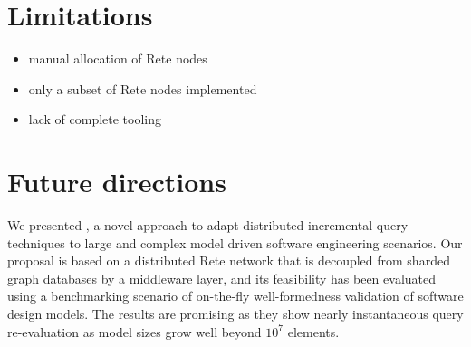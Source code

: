 \section{Limitations}

\begin{itemize}
  \item manual allocation of Rete nodes
  \item only a subset of Rete nodes implemented 
  \item lack of complete tooling   
\end{itemize}

\section{Future directions}

We presented \iqd{}, a novel approach to adapt distributed incremental query techniques to large and complex model driven software engineering scenarios. Our proposal is based on a distributed Rete network that is decoupled from sharded graph databases by a middleware layer, and its feasibility has been evaluated using a benchmarking scenario of on-the-fly well-formedness validation of software design models. The results are promising as they show nearly instantaneous query re-evaluation as model sizes grow well beyond $10^7$ elements.

